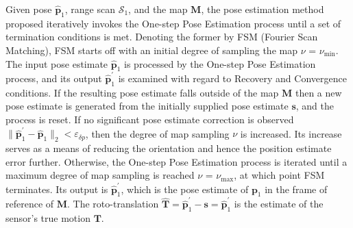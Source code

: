 Given pose $\hat{\bm{p}}_1$, range scan $\mathcal{S}_1$, and the map $\bm{M}$,
the pose estimation method proposed iteratively invokes the One-step Pose
Estimation process until a set of termination conditions is met. Denoting the
former by FSM (Fourier Scan Matching), FSM starts off with an initial degree of
sampling the map $\nu$ = $\nu_{\min}$. The input pose estimate
$\hat{\bm{p}}_1$ is processed by the One-step Pose Estimation process, and its
output $\hat{\bm{p}}_1^\prime$ is examined with regard to Recovery and
Convergence conditions. If the resulting pose estimate falls outside of the map
$\bm{M}$ then a new pose estimate is generated from the initially supplied pose
estimate $\bm{s}$, and the process is reset.  If no significant pose estimate
correction is observed $\|\hat{\bm{p}}_1^\prime-\hat{\bm{p}}_1\|_2 <
\varepsilon_{\delta p}$, then the degree of map sampling $\nu$ is increased.
Its increase serves as a means of reducing the orientation and hence the
position estimate error further.  Otherwise, the One-step Pose Estimation
process is iterated until a maximum degree of map sampling is reached $\nu$ =
$\nu_{\max}$, at which point FSM terminates. Its output is
$\hat{\bm{p}}_1^\prime$, which is the pose estimate of $\bm{p}_1$ in the frame
of reference of $\bm{M}$. The roto-translation
$\hat{\bm{T}} = \hat{\bm{p}}_1^\prime - \bm{s} = \hat{\bm{p}}_1^\prime$ is the
estimate of the sensor's true motion $\bm{T}$.
